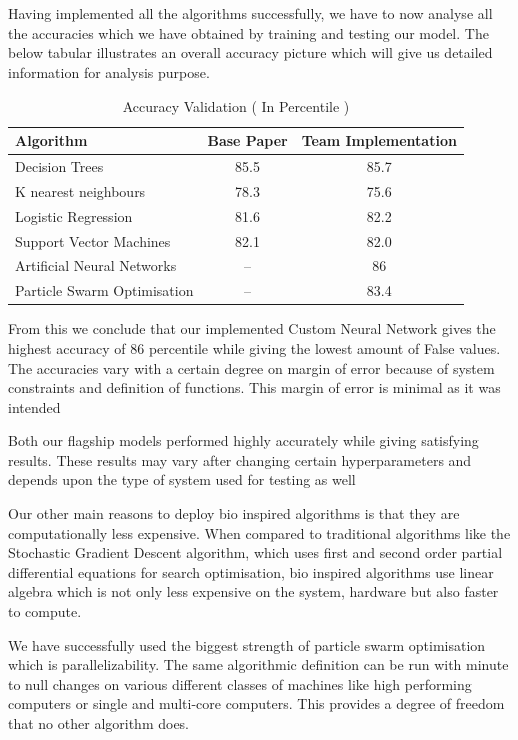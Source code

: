 \documentclass[12pt]{article}
\newcommand{\nd}{\noindent}
\newcommand{\secsize}{\fontsize{15pt}{12pt}\selectfont}
\begin{document}
\newpage
\section{\textbf{\secsize{RESULTS AND VALIDATION}}}
Having implemented all the algorithms successfully, we have to now analyse all the accuracies which we have obtained by training and testing our model. The below tabular illustrates an overall accuracy picture which will give us  detailed information for analysis purpose. 
\vspace{5mm}
\begin{table}[ht]
\centering
\caption{Accuracy Validation ( In Percentile )}
\begin{tabular}[t]{lcc}
\hline
Algorithm&Base Paper&Team Implementation\\
\hline
Decision Trees&85.5&85.7\\
K nearest neighbours&78.3&75.6\\
Logistic Regression&81.6&82.2\\
Support Vector Machines&82.1&82.0\\
Artificial Neural Networks&--&86\\
Particle Swarm Optimisation&--&83.4\\
\hline
\end{tabular}
\end{table}%

\nd From this we conclude that our implemented Custom Neural Network gives the highest accuracy of 86 percentile while giving the lowest amount of False values. The accuracies vary with a certain degree on margin of error because of system constraints and definition of functions. This margin of error is minimal as it was intended 

\nd Both our flagship models performed highly accurately while giving satisfying results. These results may vary after changing certain hyperparameters and depends upon the type of system used for testing as well 

\nd Our other main reasons to deploy bio inspired algorithms is that they are computationally less expensive. When compared to traditional algorithms like the Stochastic Gradient Descent algorithm, which uses first and second order partial differential equations for search optimisation, bio inspired algorithms use linear algebra which is not only less expensive on the system, hardware but also faster to compute. 

\nd We have successfully used the biggest strength of particle swarm optimisation which is parallelizability. The same algorithmic definition can be run with minute to null changes on various different classes of machines like high performing computers or single and multi-core computers. This provides a degree of freedom that no other algorithm does. 
\end{document}
